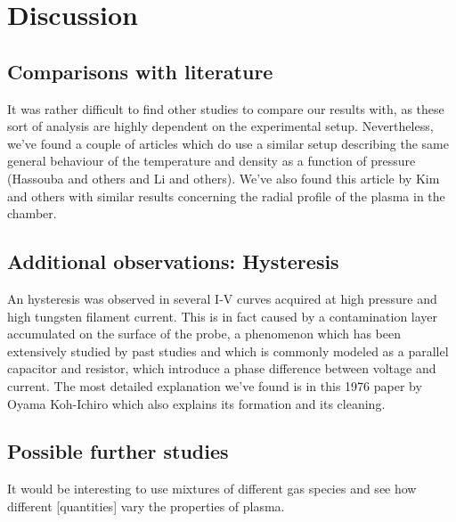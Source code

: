 \section{Discussion}
\subsection{Comparisons with literature}
It was rather difficult to find other studies to compare our results with, as these sort of analysis are highly dependent on the experimental setup.
Nevertheless, we've found a couple of articles which do use a similar setup describing the same general behaviour of the temperature and density as a function of pressure (Hassouba and others and Li and others). 
We've also found this article by Kim and others with similar results concerning the radial profile of the plasma in the chamber.

\subsection{Additional observations: Hysteresis}
An hysteresis was observed in several I-V curves acquired at high pressure and high tungsten filament current.
This is in fact caused by a contamination layer accumulated on the surface of the probe, a phenomenon which has been extensively studied by past studies and which is commonly modeled as a parallel capacitor and resistor, which introduce a phase difference between voltage and current.
The most detailed explanation we've found is in this 1976 paper by Oyama Koh-Ichiro
which also explains its formation and its cleaning.


\subsection{Possible further studies}
It would be interesting to use mixtures of different gas species and see how different [quantities] vary the properties of plasma.